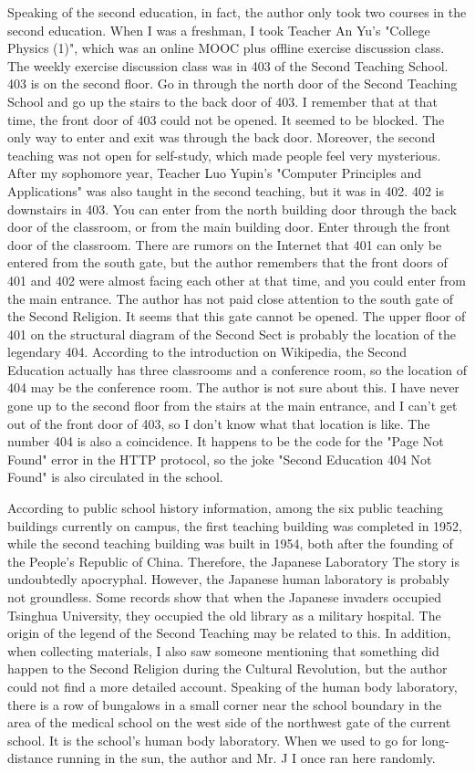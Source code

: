 Speaking of the second education, in fact, the author only took two courses in
the second education.  When I was a freshman, I took Teacher An Yu's "College
Physics (1)", which was an online MOOC plus offline exercise discussion class.
The weekly exercise discussion class was in 403 of the Second Teaching School.
403 is on the second floor. Go in through the north door of the Second Teaching
School and go up the stairs to the back door of 403. I remember that at that
time, the front door of 403 could not be opened. It seemed to be blocked. The
only way to enter and exit was through the back door. Moreover, the second
teaching was not open for self-study, which made people feel very mysterious.
After my sophomore year, Teacher Luo Yupin's "Computer Principles and
Applications" was also taught in the second teaching, but it was in 402. 402 is
downstairs in 403. You can enter from the north building door through the back
door of the classroom, or from the main building door. Enter through the front
door of the classroom.  There are rumors on the Internet that 401 can only be
entered from the south gate, but the author remembers that the front doors of
401 and 402 were almost facing each other at that time, and you could enter
from the main entrance. The author has not paid close attention to the south
gate of the Second Religion. It seems that this gate cannot be opened.  The
upper floor of 401 on the structural diagram of the Second Sect is probably the
location of the legendary 404. According to the introduction on Wikipedia, the
Second Education actually has three classrooms and a conference room, so the
location of 404 may be the conference room. The author is not sure about this.
I have never gone up to the second floor from the stairs at the main entrance,
and I can't get out of the front door of 403, so I don't know what that
location is like.  The number 404 is also a coincidence. It happens to be the
code for the "Page Not Found" error in the HTTP protocol, so the joke "Second
Education 404 Not Found" is also circulated in the school.

According to public school history information, among the six public teaching
buildings currently on campus, the first teaching building was completed in
1952, while the second teaching building was built in 1954, both after the
founding of the People's Republic of China. Therefore, the Japanese Laboratory
The story is undoubtedly apocryphal.  However, the Japanese human laboratory is
probably not groundless. Some records show that when the Japanese invaders
occupied Tsinghua University, they occupied the old library as a military
hospital. The origin of the legend of the Second Teaching may be related to
this.  In addition, when collecting materials, I also saw someone mentioning
that something did happen to the Second Religion during the Cultural
Revolution, but the author could not find a more detailed account.  Speaking of
the human body laboratory, there is a row of bungalows in a small corner near
the school boundary in the area of the medical school on the west side of the
northwest gate of the current school. It is the school’s human body laboratory.
When we used to go for long-distance running in the sun, the author and Mr. J I
once ran here randomly.


